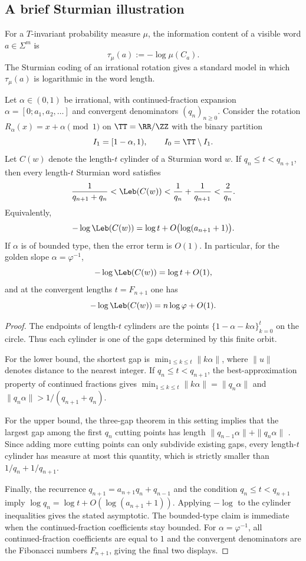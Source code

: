 \subsection{A brief Sturmian illustration}

For a \(T\)-invariant probability measure \(\mu\), the information
content of a visible word \(a\in\Sigma^m\) is
\[
  \tau_\mu(a):=-\log\mu(C_a).
\]
The Sturmian coding of an irrational rotation gives a standard model in
which \(\tau_\mu(a)\) is logarithmic in the word length.

\begin{proposition}\label{prop:sturmian-cylinder-sandwich}
Let $\alpha\in(0,1)$ be irrational, with continued-fraction expansion
$\alpha=[0;a_1,a_2,\ldots]$ and convergent denominators $(q_n)_{n\ge 0}$.
Consider the rotation $R_\alpha(x)=x+\alpha\pmod 1$ on
$\TT=\RR/\ZZ$ with the binary partition
\[
  I_1=[1-\alpha,1),
  \qquad
  I_0=\TT\setminus I_1.
\]
Let $C(w)$ denote the length-$t$ cylinder of a Sturmian word $w$.
If $q_n\le t<q_{n+1}$, then every length-$t$ Sturmian word satisfies
\[
  \frac{1}{q_{n+1}+q_n}
  < \Leb(C(w))
  < \frac{1}{q_n}+\frac{1}{q_{n+1}}
  < \frac{2}{q_n}.
\]
Equivalently,
\[
  -\log\Leb(C(w))=\log t+O\bigl(\log(a_{n+1}+1)\bigr).
\]
If $\alpha$ is of bounded type, then the error term is $O(1)$.  In
particular, for the golden slope $\alpha=\varphi^{-1}$,
\[
  -\log\Leb(C(w))=\log t+O(1),
\]
and at the convergent lengths $t=F_{n+1}$ one has
\[
  -\log\Leb(C(w))=n\log\varphi+O(1).
\]
\end{proposition}

\begin{proof}
The endpoints of length-$t$ cylinders are the points
$\{1-\alpha-k\alpha\}_{k=0}^{t}$ on the circle. Thus each cylinder is one of
the gaps determined by this finite orbit.

For the lower bound, the shortest gap is
$\min_{1\le k\le t}\|k\alpha\|$, where $\|u\|$ denotes distance to the nearest
integer. If $q_n\le t<q_{n+1}$, the best-approximation property of continued
fractions gives
$\min_{1\le k\le t}\|k\alpha\|=\|q_n\alpha\|$ and
$\|q_n\alpha\|>1/(q_{n+1}+q_n)$.

For the upper bound, the three-gap theorem in this setting implies that the
largest gap among the first $q_n$ cutting points has length
$\|q_{n-1}\alpha\|+\|q_n\alpha\|$
\cite{Slater1950DistributionIntegers,Slater1967GapsSteps}. Since adding more
cutting points can only subdivide existing gaps, every length-$t$ cylinder has
measure at most this quantity, which is strictly smaller than
$1/q_n+1/q_{n+1}$.

Finally, the recurrence $q_{n+1}=a_{n+1}q_n+q_{n-1}$ and the condition
$q_n\le t<q_{n+1}$ imply
$\log q_n=\log t+O(\log(a_{n+1}+1))$.
Applying $-\log$ to the cylinder inequalities gives the stated
asymptotic.  The bounded-type claim is immediate when the
continued-fraction coefficients stay bounded.  For
$\alpha=\varphi^{-1}$, all continued-fraction coefficients are equal to
$1$ and the convergent denominators are the Fibonacci numbers
$F_{n+1}$, giving the final two displays.
\end{proof}

